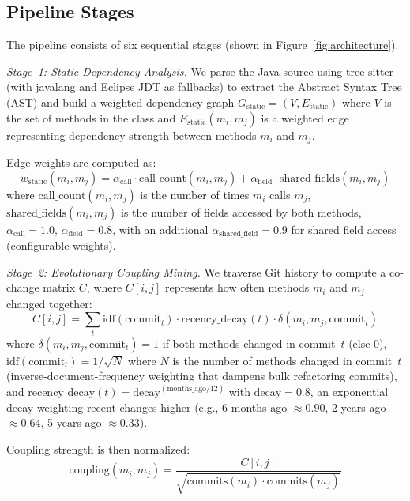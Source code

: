 \documentclass[sigconf]{acmart}
\begin{document}
\subsection{Pipeline Stages}
\label{sec:pipeline}

The pipeline consists of six sequential stages (shown in
Figure~\ref{fig:architecture}).

\textit{Stage~1: Static Dependency Analysis.}  We parse the Java source using
tree-sitter (with javalang and Eclipse JDT as fallbacks) to extract the
Abstract Syntax Tree (AST) and build a weighted dependency graph
$G_{\text{static}} = (V, E_{\text{static}})$ where $V$ is the set of methods
in the class and $E_{\text{static}}(m_i, m_j)$ is a weighted edge representing
dependency strength between methods $m_i$ and $m_j$.

Edge weights are computed as:
{\small
\begin{equation}
w_{\text{static}}(m_i, m_j) = \alpha_{\text{call}} \!\cdot\! \text{call\_count}(m_i, m_j)
  + \alpha_{\text{field}} \!\cdot\! \text{shared\_fields}(m_i, m_j)
\label{eq:static}
\end{equation}
}%
where $\text{call\_count}(m_i,m_j)$ is the number of times $m_i$ calls
$m_j$, $\text{shared\_fields}(m_i,m_j)$ is the number of fields accessed
by both methods, $\alpha_{\text{call}}{=}1.0$, $\alpha_{\text{field}}{=}0.8$,
with an additional $\alpha_{\text{shared\_field}}{=}0.9$ for shared field
access (configurable weights).

\textit{Stage~2: Evolutionary Coupling Mining.}  We traverse Git history to
compute a co-change matrix $C$, where $C[i,j]$ represents how often methods
$m_i$ and $m_j$ changed together:
{\small
\begin{equation}
C[i,j] = \sum_t \text{idf}(\text{commit}_t) \!\cdot\! \text{recency\_decay}(t)
  \!\cdot\! \delta(m_i, m_j, \text{commit}_t)
\label{eq:cochange}
\end{equation}
}%
where $\delta(m_i,m_j,\text{commit}_t) = 1$ if both methods changed in
commit~$t$ (else 0), $\text{idf}(\text{commit}_t) = 1/\sqrt{N}$ where $N$ is
the number of methods changed in commit~$t$ (inverse-document-frequency
weighting that dampens bulk refactoring commits), and
$\text{recency\_decay}(t) = \text{decay}^{(\text{months\_ago}/12)}$ with
$\text{decay}=0.8$, an exponential decay weighting recent changes higher (e.g.,
6 months ago $\approx 0.90$, 2 years ago $\approx 0.64$, 5 years ago
$\approx 0.33$).

Coupling strength is then normalized:
{\small
\begin{equation}
\text{coupling}(m_i,m_j) = \frac{C[i,j]}{\sqrt{\text{commits}(m_i) \!\cdot\! \text{commits}(m_j)}}
\label{eq:coupling}
\end{equation}
}%
\end{document}

